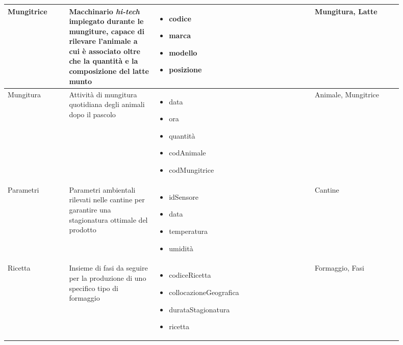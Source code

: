 \documentclass[12pt,a4paper]{article}
\begin{document}
\begin{center}
\begin{longtable}{|p{0.14\linewidth}|p{0.20\linewidth}|p{0.36\linewidth}|p{0.20\linewidth}|}
\hline
Mungitrice				 	&  Macchinario \textit{hi-tech} impiegato durante le mungiture, capace di rilevare l'animale a cui è associato oltre che la quantità e la composizione del latte munto 
					& \begin{itemize}
						\setlength{\itemindent}{-1em}
						\vspace{-25pt}
						\setlength\itemsep{-0.25em}
						\item codice
						\item marca
						\item modello
						\item posizione
					\end{itemize}
					&  Mungitura, Latte  \\ 

\hline
Mungitura				 	&  Attività di mungitura quotidiana degli animali dopo il pascolo 
					& \begin{itemize}
						\setlength{\itemindent}{-1em}
						\vspace{-25pt}
						\setlength\itemsep{-0.25em}
						\item data
						\item ora
						\item quantità
						\item codAnimale
						\item codMungitrice
					\end{itemize}
					&  Animale, Mungitrice  \\ 

\hline
Parametri				 	&  Parametri ambientali rilevati nelle cantine per garantire una stagionatura ottimale del prodotto 
					& \begin{itemize}
						\setlength{\itemindent}{-1em}
						\vspace{-25pt}
						\setlength\itemsep{-0.25em}
						\item idSensore
						\item data
						\item temperatura
						\item umidità
						
					\end{itemize}
					&  Cantine  \\ 

\hline
Ricetta				 	&  Insieme di fasi da seguire per la produzione di uno specifico tipo di formaggio  
					& \begin{itemize}
						\setlength{\itemindent}{-1em}
						\vspace{-25pt}
						\setlength\itemsep{-0.25em}
						\item codiceRicetta
						\item collocazioneGeografica
						\item durataStagionatura
						\item ricetta
					\end{itemize}
					&  Formaggio, Fasi  \\ 


\end{longtable}
\end{center}
\end{document}
